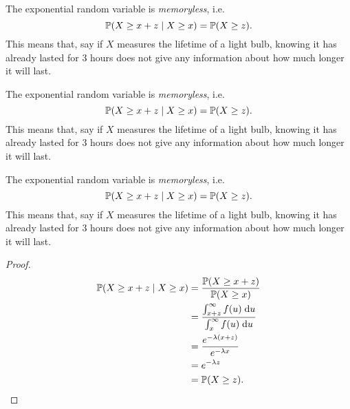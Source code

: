 \begin{note}
  \begin{field}
    \begin{prop}
      The exponential random variable is \emph{memoryless}, i.e.
      \[
        \P(X \geq x + z \mid X \geq x) = \P(X \geq z).
      \]
      This means that, say if $X$ measures the lifetime of a light bulb, knowing it has already lasted for 3 hours does not give any information about how much longer it will last.
    \end{prop}
  \end{field}
  \begin{field}
    \begin{prop}
      The exponential random variable is \emph{memoryless}, i.e.
      \[
        \P(X \geq x + z \mid X \geq x) = \P(X \geq z).
      \]
      This means that, say if $X$ measures the lifetime of a light bulb, knowing it has already lasted for 3 hours does not give any information about how much longer it will last.
    \end{prop}
  \end{field}
  \xplain{}%
\end{note}

%
\begin{note}
  \begin{field}
    \begin{prop}
      The exponential random variable is \emph{memoryless}, i.e.
      \[
        \P(X \geq x + z \mid X \geq x) = \P(X \geq z).
      \]
      This means that, say if $X$ measures the lifetime of a light bulb, knowing it has already lasted for 3 hours does not give any information about how much longer it will last.
    \end{prop}
  \end{field}
  \begin{field}
    \begin{proof}
      \begin{align*}
        \P(X \geq x + z \mid X \geq x) &= \frac{\P(X \geq x + z)}{\P(X \geq x)}\\
        &= \frac{\int_{x + z}^\infty f(u)\;\d u}{\int_x^\infty f(u)\;\d u}\\
        &= \frac{e^{-\lambda(x + z)}}{e^{-\lambda x}}\\
        &= e^{-\lambda z}\\
        &= \P(X \geq z).\qedhere
      \end{align*}
    \end{proof}
  \end{field}
  \xplain{}%
\end{note}


